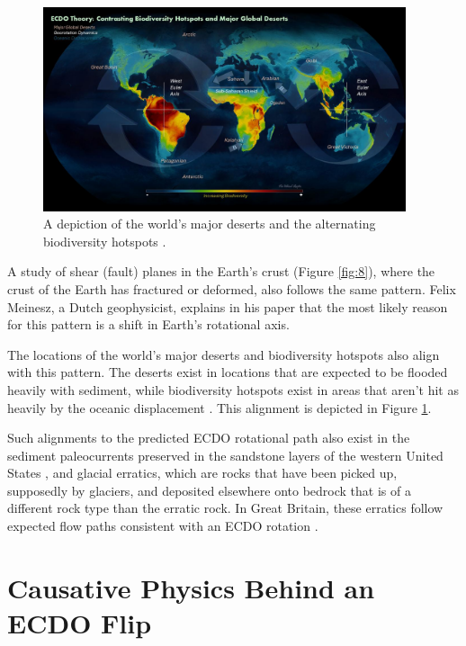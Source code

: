 \documentclass[10pt,twocolumn,letterpaper]{article}
\begin{document}
\begin{figure}[t]
\begin{center}
\includegraphics[width=0.95\textwidth]{biodiversity.jpg}
\end{center}
   \caption{A depiction of the world's major deserts and the alternating biodiversity hotspots \cite{28}.}
\label{fig:9}
\end{figure}

A study of shear (fault) planes in the Earth's crust (Figure \ref{fig:8}), where the crust of the Earth has fractured or deformed, also follows the same pattern. Felix Meinesz, a Dutch geophysicist, explains in his paper \cite{36} that the most likely reason for this pattern is a shift in Earth's rotational axis.

The locations of the world's major deserts and biodiversity hotspots also align with this pattern. The deserts exist in locations that are expected to be flooded heavily with sediment, while biodiversity hotspots exist in areas that aren't hit as heavily by the oceanic displacement \cite{28}. This alignment is depicted in Figure \ref{fig:9}.

Such alignments to the predicted ECDO rotational path also exist in the sediment paleocurrents preserved in the sandstone layers of the western United States \cite{21}, and glacial erratics, which are rocks that have been picked up, supposedly by glaciers, and deposited elsewhere onto bedrock that is of a different rock type than the erratic rock. In Great Britain, these erratics follow expected flow paths consistent with an ECDO rotation \cite{67,68}.

\section{Causative Physics Behind an ECDO Flip}
\end{document}
